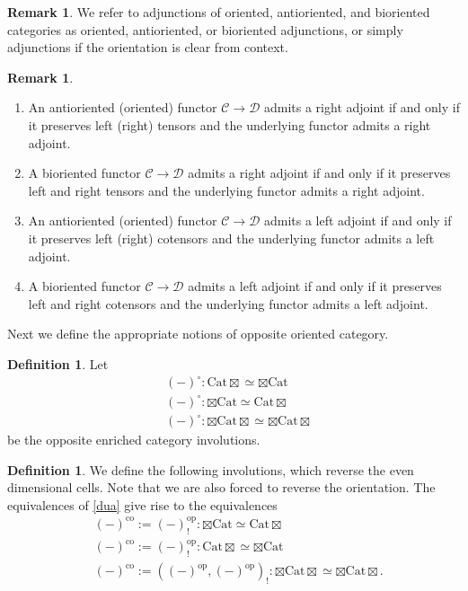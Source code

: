 \documentclass[10pt,oneside]{article}
\numberwithin{equation}{section} %
\numberwithin{figure}{section} %
\theoremstyle{plain}
\theoremstyle{definition}
\newtheorem{definition}[theorem]{Definition}
\newtheorem{remark}[theorem]{Remark}
\newcommand{\mC}{{\mathcal C}}
\newcommand{\mD}{{\mathcal D}}
\newcommand{\op}{\mathrm{op}}
\newcommand{\co}{\mathrm{co}}
\newcommand{\Cat}{\mathrm{Cat}}
\begin{document}
\begin{remark}
We refer to adjunctions of oriented, antioriented, and bioriented categories as oriented, antioriented, or bioriented adjunctions, or simply adjunctions if the orientation is clear from context.
\end{remark}

\begin{remark}\label{adj2}
\begin{enumerate}[\normalfont(1)]\setlength{\itemsep}{-2pt}
\item An antioriented (oriented) functor $\mC \to \mD$ admits a right adjoint if and only if it preserves left (right) tensors and the underlying functor admits a right adjoint.

\item A bioriented functor $\mC \to \mD$ admits a right adjoint if and only if it preserves left and right tensors and the underlying functor admits a right adjoint.

\item An antioriented (oriented) functor $\mC \to \mD$ admits a left adjoint if and only if it preserves left (right) cotensors and the underlying functor admits a left adjoint.
	
\item A bioriented functor $\mC \to \mD$ admits a left adjoint if and only if it preserves left and right cotensors and the underlying functor admits a left adjoint.

\end{enumerate}

\end{remark}



Next we define the appropriate notions of opposite oriented category.

\begin{definition}
    
Let
\begin{align*}
&(-)^\circ: {\Cat\boxtimes} \simeq {\boxtimes\Cat}\\
&(-)^\circ: {\boxtimes\Cat} \simeq {\Cat\boxtimes}\\
&(-)^\circ:  {\boxtimes\Cat\boxtimes} \simeq {\boxtimes\Cat\boxtimes}
\end{align*}
be the opposite enriched category involutions.	
	
\end{definition}

\begin{definition}
We define the following involutions, which reverse the even dimensional cells.
Note that we are also forced to reverse the orientation.
The equivalences of \cref{dua} give rise to the equivalences
\begin{align*}
&(-)^\co:= (-)^\op_!: {\boxtimes\Cat} \simeq {\Cat\boxtimes}\\
&(-)^\co:= (-)^\op_!: {\Cat\boxtimes} \simeq {\boxtimes\Cat}\\
&(-)^\co:= ((-)^\op, (-)^\op)_!: {\boxtimes\Cat\boxtimes} \simeq {\boxtimes\Cat\boxtimes}.
\end{align*}
\end{definition}
\end{document}

